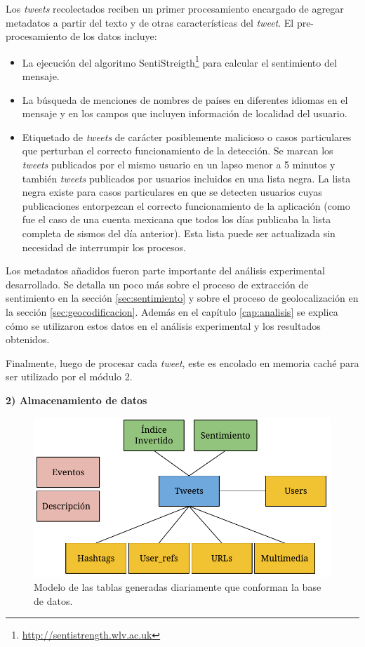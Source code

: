 Los \textit{tweets} recolectados reciben un primer procesamiento encargado de agregar metadatos a partir del texto y de otras características del \textit{tweet}. El pre-procesamiento de los datos incluye:
\begin{itemize}
\item La ejecución del algoritmo SentiStreigth\footnote{\url{http://sentistrength.wlv.ac.uk}} para calcular el sentimiento del mensaje.
\item La búsqueda de menciones de nombres de países en diferentes idiomas en el mensaje y en los campos que incluyen información de localidad del usuario.
\item Etiquetado de \textit{tweets} de carácter posiblemente malicioso o casos particulares que perturban el correcto funcionamiento de la detección. Se marcan los \textit{tweets} publicados por el mismo usuario en un lapso menor a 5 minutos y también \textit{tweets} publicados por usuarios incluidos en una lista negra. La lista negra existe para casos particulares en que se detecten usuarios cuyas publicaciones entorpezcan el correcto funcionamiento de la aplicación (como fue el caso de una cuenta mexicana que todos los días publicaba la lista completa de sismos del día anterior). Esta lista puede ser actualizada sin necesidad de interrumpir los procesos. 
\end{itemize}

Los metadatos añadidos fueron parte importante del análisis experimental desarrollado. Se detalla un poco más sobre el proceso de extracción de sentimiento en la sección \ref{sec:sentimiento} y sobre el proceso de geolocalización en la sección \ref{sec:geocodificacion}. Además en el capítulo \ref{cap:analisis} se explica cómo se utilizaron estos datos en el análisis experimental y los resultados obtenidos.

Finalmente, luego de procesar cada \textit{tweet}, este es encolado en memoria caché para ser utilizado por el módulo 2.

\noindent\textbf{2) Almacenamiento de datos}

\begin{figure}[ht]
	\centering
	\includegraphics[width=0.8\linewidth]{imagenes/tweetmodel.pdf}
	\caption{Modelo de las tablas generadas diariamente que conforman la base de datos.}
	\label{img:database}
\end{figure}

